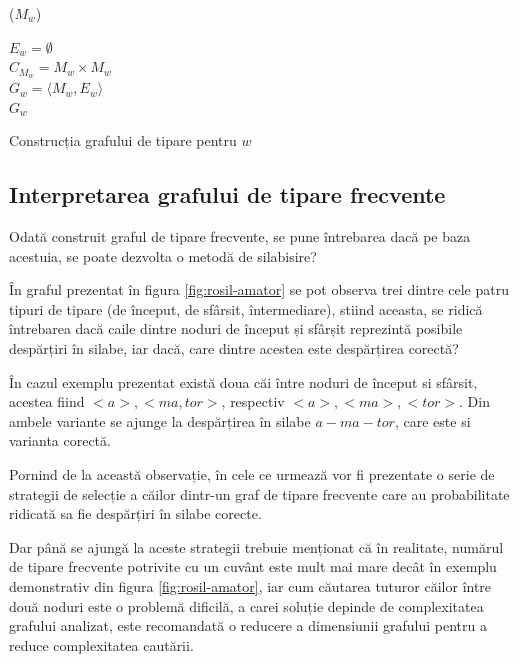\begin{algorithm}
\SetAlgoLined
{}

\ppg($M_w$) \\

$E_w = \emptyset$ \\
$C_{M_w} = M_w \times M_w$ \\
$G_w = \langle M_w, E_w \rangle$ \\
\KwRet $G_w$
\vspace{.1cm}

\caption{Construcția grafului de tipare pentru $w$}
\label{algo:buildMatchedPatternGraph}
\end{algorithm}


\subsection{Interpretarea grafului de tipare frecvente}

Odată construit graful de tipare frecvente, se pune întrebarea dacă pe baza acestuia, se poate dezvolta o metodă de silabisire? 

În graful prezentat în figura \ref{fig:rosil-amator} se pot observa trei dintre cele patru tipuri de tipare (de început, de sfârsit, întermediare), stiind aceasta, se ridică întrebarea dacă caile dintre noduri de început și sfârșit reprezintă posibile despărțiri în silabe, iar dacă, care dintre acestea este despărțirea corectă?

În cazul exemplu prezentat există doua căi între noduri de început si sfârsit, acestea fiind $<a>, <ma, tor>$, respectiv $<a>, <ma>, <tor>$. Din ambele variante se ajunge la despărțirea în silabe $a-ma-tor$, care este si varianta corectă. 

Pornind de la această observație, în cele ce urmează vor fi prezentate o serie de strategii de selecție a căilor dintr-un graf de tipare frecvente care au probabilitate ridicată sa fie despărțiri în silabe corecte. 

Dar până se ajungă la aceste strategii trebuie menționat că în realitate, numărul de tipare frecvente potrivite cu un cuvânt este mult mai mare decât în exemplu demonstrativ din figura \ref{fig:rosil-amator}, iar cum căutarea tuturor căilor între două noduri este o problemă dificilă, a carei soluție depinde de complexitatea grafului analizat, este recomandată o reducere a dimensiunii grafului pentru a reduce complexitatea cautării. 

